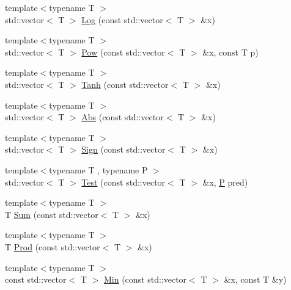 \begin{DoxyCompactItemize}
\item 
{\footnotesize template$<$typename T $>$ }\\std\+::vector$<$ T $>$ \hyperlink{centroidalifold_2contrafold_2_utilities_8ipp_a466966e2539438481f776b9439ba9f78}{Log} (const std\+::vector$<$ T $>$ \&x)
\item 
{\footnotesize template$<$typename T $>$ }\\std\+::vector$<$ T $>$ \hyperlink{centroidalifold_2contrafold_2_utilities_8ipp_af855c94a7de5278e38bcdb7f92a5c269}{Pow} (const std\+::vector$<$ T $>$ \&x, const T p)
\item 
{\footnotesize template$<$typename T $>$ }\\std\+::vector$<$ T $>$ \hyperlink{centroidalifold_2contrafold_2_utilities_8ipp_a06f06e0b783488133ecf5ec215364c5e}{Tanh} (const std\+::vector$<$ T $>$ \&x)
\item 
{\footnotesize template$<$typename T $>$ }\\std\+::vector$<$ T $>$ \hyperlink{centroidalifold_2contrafold_2_utilities_8ipp_ab937f6ab2d41fa4dfbeb67b8d3be0a5e}{Abs} (const std\+::vector$<$ T $>$ \&x)
\item 
{\footnotesize template$<$typename T $>$ }\\std\+::vector$<$ T $>$ \hyperlink{centroidalifold_2contrafold_2_utilities_8ipp_ad703b4b46a29bf917575e22f84d8d199}{Sign} (const std\+::vector$<$ T $>$ \&x)
\item 
{\footnotesize template$<$typename T , typename P $>$ }\\std\+::vector$<$ T $>$ \hyperlink{centroidalifold_2contrafold_2_utilities_8ipp_af04cb7317628b0438926fb652ac41e2d}{Test} (const std\+::vector$<$ T $>$ \&x, \hyperlink{pf__duplex_8c_a54f9e847235c2061dfd403c5869b5e2d}{P} pred)
\item 
{\footnotesize template$<$typename T $>$ }\\T \hyperlink{centroidalifold_2contrafold_2_utilities_8ipp_a727bddb8389af19f389a42b5117a7328}{Sum} (const std\+::vector$<$ T $>$ \&x)
\item 
{\footnotesize template$<$typename T $>$ }\\T \hyperlink{centroidalifold_2contrafold_2_utilities_8ipp_a7ad28d2b759a85d7d7ad2b1839965f11}{Prod} (const std\+::vector$<$ T $>$ \&x)
\item 
{\footnotesize template$<$typename T $>$ }\\const std\+::vector$<$ T $>$ \hyperlink{centroidalifold_2contrafold_2_utilities_8ipp_afb34320e7191fcfe6a715bdebcbdc00c}{Min} (const std\+::vector$<$ T $>$ \&x, const T \&y)

\end{DoxyCompactItemize}
